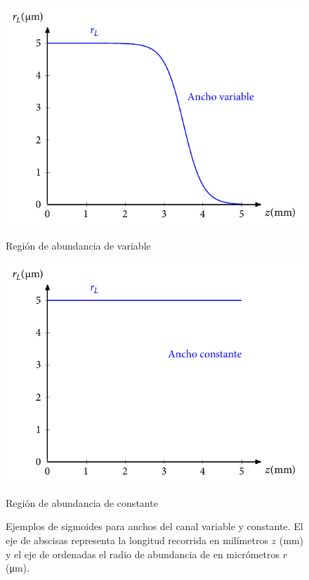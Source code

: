 \begin{figure}[htbp]
  \centering
  \begin{subcaptionblock}{.4\textwidth}
    \centering
    \includegraphics[width=\textwidth]{Figuras/ch4_ejsigm1.pdf}
    \caption{Región de abundancia de  variable}\label{fig:ch4_sigma}
  \end{subcaptionblock}
  \begin{subcaptionblock}{.4\textwidth}
    \centering
    \includegraphics[width=\textwidth]{Figuras/ch4_ejsigm2.pdf}
    \caption{Región de abundancia de  constante}\label{fig:ch4_sigmb}
  \end{subcaptionblock}
   \caption{Ejemplos de sigmoides para anchos del canal variable y constante. El eje de abscisas representa la longitud recorrida en milímetros $z$ (\unit{mm}) y el eje de ordenadas el radio de abundancia de  en micrómetros $r$ (\unit{\um}).}
   \label{fig:4.3}
\end{figure}

